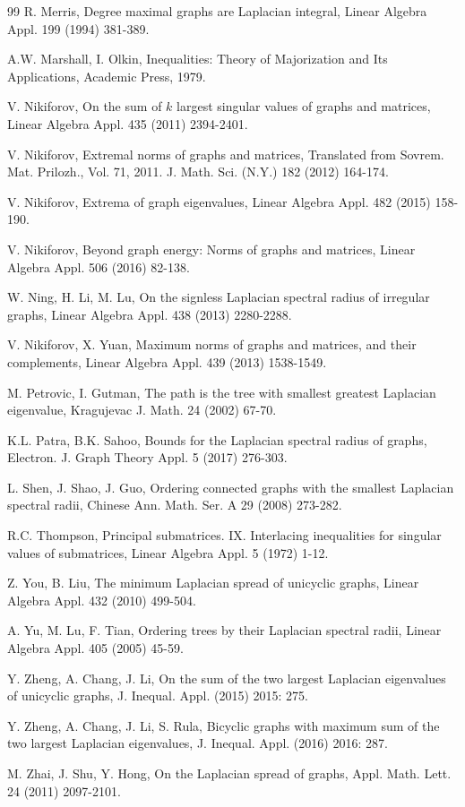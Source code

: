 \documentclass[12pt, a4paper]{article}
\begin{document}
{\begin{thebibliography}{99}
 R. Merris, Degree maximal graphs are Laplacian integral, Linear Algebra Appl. 199 (1994) 381-389.

 A.W. Marshall, I. Olkin, Inequalities: Theory of Majorization and Its Applications, Academic Press, 1979.

 V. Nikiforov, On the sum of $k$ largest singular values of graphs and matrices, Linear Algebra Appl. 435 (2011) 2394-2401.

 V. Nikiforov, Extremal norms of graphs and matrices, Translated from Sovrem. Mat. Prilozh., Vol. 71, 2011. J. Math. Sci. (N.Y.) 182 (2012) 164-174.

 V. Nikiforov, Extrema of graph eigenvalues, Linear Algebra Appl. 482 (2015) 158-190.

 V. Nikiforov, Beyond graph energy: Norms of graphs and matrices, Linear Algebra Appl. 506 (2016) 82-138.

 W. Ning, H. Li, M. Lu, On the signless Laplacian spectral radius of irregular graphs, Linear Algebra Appl. 438 (2013) 2280-2288.

 V. Nikiforov, X. Yuan, Maximum norms of graphs and matrices, and their complements, Linear Algebra Appl. 439 (2013) 1538-1549.

 M. Petrovic, I. Gutman, The path is the tree with smallest greatest Laplacian eigenvalue, Kragujevac J. Math. 24 (2002) 67-70.

  K.L. Patra, B.K. Sahoo, Bounds for the Laplacian spectral radius of graphs, Electron. J. Graph Theory Appl. 5 (2017) 276-303.

 L. Shen, J. Shao, J. Guo, Ordering connected graphs with the smallest Laplacian spectral radii, Chinese Ann. Math. Ser. A 29 (2008) 273-282.

 R.C. Thompson, Principal submatrices. IX. Interlacing inequalities for singular values of submatrices, Linear Algebra Appl. 5 (1972) 1-12.

 Z. You, B. Liu, The minimum Laplacian spread of unicyclic graphs, Linear Algebra Appl. 432 (2010) 499-504.

 A. Yu, M. Lu, F. Tian, Ordering trees by their Laplacian spectral radii, Linear Algebra Appl. 405 (2005) 45-59.

 Y. Zheng, A. Chang, J. Li, On the sum of the two largest Laplacian eigenvalues of unicyclic graphs, J. Inequal. Appl. (2015) 2015: 275.

 Y. Zheng, A. Chang, J. Li, S. Rula, Bicyclic graphs with maximum sum of the two largest Laplacian eigenvalues, J. Inequal. Appl. (2016) 2016: 287.

 M. Zhai, J. Shu, Y. Hong, On the Laplacian spread of graphs, Appl. Math. Lett. 24 (2011) 2097-2101.







\end{thebibliography}
}
\end{document}
